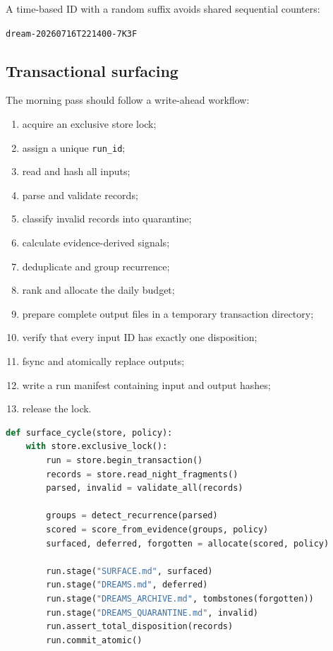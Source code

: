 \documentclass[11pt,a4paper]{article}
\begin{document}
A time-based ID with a random suffix avoids shared sequential counters:

\begin{center}
\texttt{dream-20260716T221400-7K3F}
\end{center}

\subsection{Transactional surfacing}

The morning pass should follow a write-ahead workflow:

\begin{enumerate}
  \item acquire an exclusive store lock;
  \item assign a unique \texttt{run\_id};
  \item read and hash all inputs;
  \item parse and validate records;
  \item classify invalid records into quarantine;
  \item calculate evidence-derived signals;
  \item deduplicate and group recurrence;
  \item rank and allocate the daily budget;
  \item prepare complete output files in a temporary transaction directory;
  \item verify that every input ID has exactly one disposition;
  \item fsync and atomically replace outputs;
  \item write a run manifest containing input and output hashes;
  \item release the lock.
\end{enumerate}

\begin{lstlisting}[language=Python,caption={Conceptual surfacing transaction.}]
def surface_cycle(store, policy):
    with store.exclusive_lock():
        run = store.begin_transaction()
        records = store.read_night_fragments()
        parsed, invalid = validate_all(records)

        groups = detect_recurrence(parsed)
        scored = score_from_evidence(groups, policy)
        surfaced, deferred, forgotten = allocate(scored, policy)

        run.stage("SURFACE.md", surfaced)
        run.stage("DREAMS.md", deferred)
        run.stage("DREAMS_ARCHIVE.md", tombstones(forgotten))
        run.stage("DREAMS_QUARANTINE.md", invalid)
        run.assert_total_disposition(records)
        run.commit_atomic()
\end{lstlisting}
\end{document}
